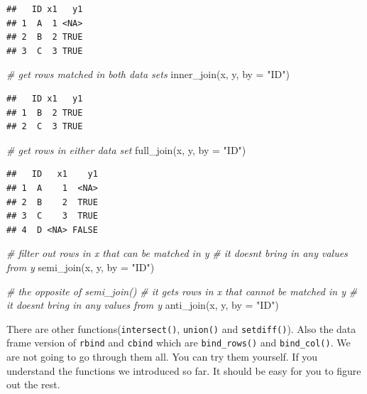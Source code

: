 \documentclass[
  12pt,
]{krantz}
\makeatletter
\newenvironment{Shaded}{\begin{snugshade}}{\end{snugshade}}
\newcommand{\AttributeTok}[1]{\textcolor[rgb]{0.61,0.61,0.61}{#1}}
\newcommand{\CommentTok}[1]{\textcolor[rgb]{0.37,0.37,0.37}{\textit{#1}}}
\newcommand{\FunctionTok}[1]{\textcolor[rgb]{0,0,0}{#1}}
\newcommand{\NormalTok}[1]{#1}
\newcommand{\StringTok}[1]{\textcolor[rgb]{0.5,0.5,0.5}{#1}}
\newenvironment{kframe}{%
\medskip{}
\setlength{\fboxsep}{.8em}
 \def\at@end@of@kframe{}%
 \ifinner\ifhmode%
  \def\at@end@of@kframe{\end{minipage}}%
  \begin{minipage}{\columnwidth}%
 \fi\fi%
 \def\FrameCommand##1{\hskip\@totalleftmargin \hskip-\fboxsep
 \colorbox{shadecolor}{##1}\hskip-\fboxsep
     \hskip-\linewidth \hskip-\@totalleftmargin \hskip\columnwidth}%
 \MakeFramed {\advance\hsize-\width
   \@totalleftmargin\z@ \linewidth\hsize
   \@setminipage}}%
 {\par\unskip\endMakeFramed%
 \at@end@of@kframe}
\renewenvironment{Shaded}{\begin{kframe}}{\end{kframe}}
\makeatother
\begin{document}
\begin{verbatim}
##   ID x1   y1
## 1  A  1 <NA>
## 2  B  2 TRUE
## 3  C  3 TRUE
\end{verbatim}

\begin{Shaded}
\begin{Highlighting}[]
\CommentTok{\# get rows matched in both data sets}
\FunctionTok{inner\_join}\NormalTok{(x, y, }\AttributeTok{by =} \StringTok{"ID"}\NormalTok{)}
\end{Highlighting}
\end{Shaded}

\begin{verbatim}
##   ID x1   y1
## 1  B  2 TRUE
## 2  C  3 TRUE
\end{verbatim}

\begin{Shaded}
\begin{Highlighting}[]
\CommentTok{\# get rows in either data set}
\FunctionTok{full\_join}\NormalTok{(x, y, }\AttributeTok{by =} \StringTok{"ID"}\NormalTok{)}
\end{Highlighting}
\end{Shaded}

\begin{verbatim}
##   ID   x1    y1
## 1  A    1  <NA>
## 2  B    2  TRUE
## 3  C    3  TRUE
## 4  D <NA> FALSE
\end{verbatim}

\begin{Shaded}
\begin{Highlighting}[]
\CommentTok{\# filter out rows in x that can be matched in y }
\CommentTok{\# it doesn\textquotesingle{}t bring in any values from y }
\FunctionTok{semi\_join}\NormalTok{(x, y, }\AttributeTok{by =} \StringTok{"ID"}\NormalTok{)}
\end{Highlighting}
\end{Shaded}

\begin{Shaded}
\begin{Highlighting}[]
\CommentTok{\# the opposite of  semi\_join()}
\CommentTok{\# it gets rows in x that cannot be matched in y}
\CommentTok{\# it doesn\textquotesingle{}t bring in any values from y}
\FunctionTok{anti\_join}\NormalTok{(x, y, }\AttributeTok{by =} \StringTok{"ID"}\NormalTok{)}
\end{Highlighting}
\end{Shaded}

There are other functions(\texttt{intersect()}, \texttt{union()} and \texttt{setdiff()}). Also the data frame version of \texttt{rbind} and \texttt{cbind} which are \texttt{bind\_rows()} and \texttt{bind\_col()}. We are not going to go through them all. You can try them yourself. If you understand the functions we introduced so far. It should be easy for you to figure out the rest.
\end{document}
